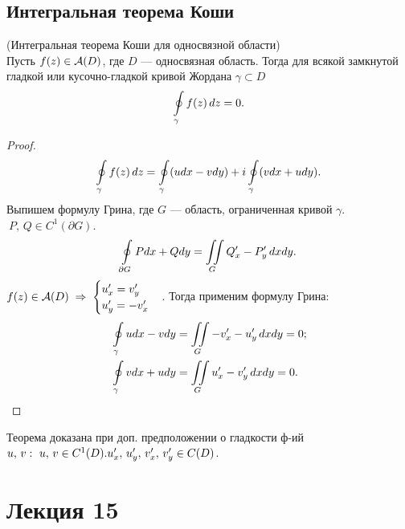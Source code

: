 	\subsection{Интегральная теорема Коши}
	\begin{theorem*}
		(Интегральная теорема Коши для односвязной области)\\
		\indent Пусть $f(z)\in\mathcal{A}(D)$, где $D$ --- односвязная область.
		Тогда для всякой замкнутой гладкой или кусочно-гладкой кривой Жордана $\gamma \subset D$
		\[ \oint\limits_\gamma f(z) \, dz = 0. \] 
	\end{theorem*}
	\begin{proof}
		\[ \oint\limits_\gamma f(z)\,dz = \oint\limits_\gamma (udx - vdy) + i\oint\limits_\gamma (vdx + udy). \]
		Выпишем формулу Грина, где $G$ --- область, ограниченная кривой $\gamma$. $\ P,\,Q \in C^1(\partial G)$.
		\[ \oint\limits_{\partial G} Pdx + Qdy = \iint\limits_G Q'_x - P'_y\,dxdy.\]
		$ f(z) \in \mathcal{A}(D) \;\Rightarrow\; \begin{cases} u'_x = v'_y\\u'_y = -v'_x \end{cases} $. Тогда применим формулу Грина:
		\begin{align*}
			&\oint\limits_\gamma udx - vdy = \iint\limits_G -v'_x - u'_y\, dxdy = 0;\\
			&\oint\limits_\gamma vdx + udy = \iint\limits_G u'_x - v'_y\, dxdy = 0 .
		\end{align*}
	\end{proof}
	\vspace{-\baselineskip}
	\begin{remark}
		Теорема доказана при доп. предположении о гладкости ф-ий $u,\,v:\ u,\,v\in C^1(D).\\ 
		u'_x,\,u'_y,\,v'_x,\,v'_y\in C(D)$.
	\end{remark}
	\newpage
	\section{Лекция 15}
